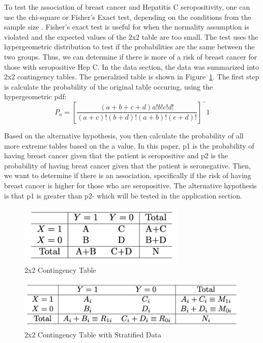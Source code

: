 \documentclass[12pt, titlepage]{article}
\begin{document}
To test the association of breast cancer and Hepatitis C seropositivity, one can use
the chi-square or Fisher's Exact test, depending on the
conditions from the sample size \citep{warner2013testing}. Fisher's
exact test is useful for when the normality assumption is violated 
and the expected values of the 2x2 table are too small. The test uses 
the hypergeometric distribution to test if the probabilities are
the same between the two groups. Thus, we can determine if there is 
more of a risk of breast cancer for those with seropositive Hep C.
In the data section, the data was summarized into 2x2 contingency tables.
The generalzied table is shown in Figure~\ref{fig:table}.
The first step is calculate the probability of the original table occuring,
using the hypergeometric pdf:
\begin{equation}
P_a=[\frac{(a+b+c+d)a!b!c!d!}{(a+c)!(b+d)!(a+b)!(c+d)!}]^-1
\end{equation}

Based on the alternative hypothesis, you then calculate the probability of 
all more extreme tables based on the a value. In this paper, p1 is the
probability of having breast cancer given that the patient is seropositive
and p2 is the probability of having breat cancer given that the patient
is seronegative. Then, we want to determine if there is an association,
specifically if the risk of having breast cancer is higher for those who
are seropositive. The alternative hypothesis is that p1 is greater than p2-
which will be tested in the application section.

\begin{figure}[tbp]
  \centering
  \includegraphics[width=8cm]{table.png}
  \caption{2x2 Contingency Table}
  \label{fig:table}
\end{figure}

\begin{figure}[tbp]
  \centering
  \includegraphics[width=12cm]{2x2 stratified table.png}
  \caption{2x2 Contingency Table with Stratified Data}
  \label{fig:strat}
\end{figure}
\end{document}
